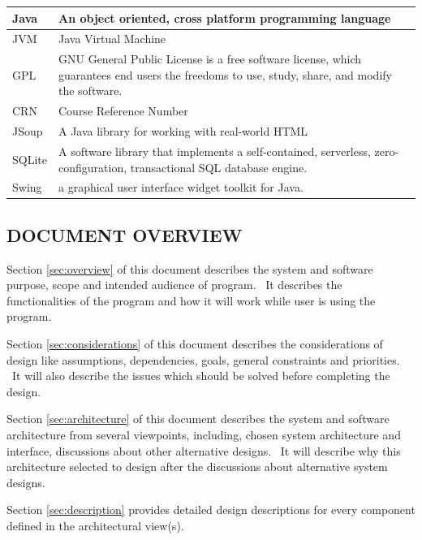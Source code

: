 \documentclass[twoside,letterpaper]{article}
\begin{document}
\begin{flushleft}
\begin{longtable}{|m{1.3587599in}|m{5.00806in}|}
\\\hline
Java & 
An object oriented, cross platform programming language
\\\hline
JVM & 
Java Virtual Machine
\\\hline
GPL &
GNU General Public License is a free software license, which guarantees end users the freedoms to use, study, share, and modify the software. 
\\\hline
CRN &
Course Reference Number  
\\\hline
JSoup &
 A Java library for working with real-world HTML  
\\\hline
SQLite &
A software library that implements a self-contained, serverless, zero-configuration, transactional SQL database engine.  
\\\hline
Swing &
 a graphical user interface widget toolkit for Java.
\\\hline
\end{longtable}
\end{flushleft}

\smallskip

\subsection{DOCUMENT OVERVIEW}

\noindent
Section \ref{sec:overview} of this document describes the system and software purpose, scope and intended audience of program. \ 
It describes the functionalities of the program and how it will work while user is using the program. 

\bigskip

\noindent
Section \ref{sec:considerations} of this document describes the considerations of design like assumptions, dependencies, goals, general constraints and priorities. \ It will also describe the issues which should be solved before completing the design.

\bigskip

\noindent
Section \ref{sec:architecture} of this document describes the system and software architecture from several viewpoints, including, chosen system architecture and interface, discussions about other alternative designs. \ It will describe why this architecture selected to design after the discussions about alternative system designs.

\bigskip

\noindent
Section \ref{sec:description} provides detailed design descriptions for every component defined in the architectural view(s). 
\end{document}
